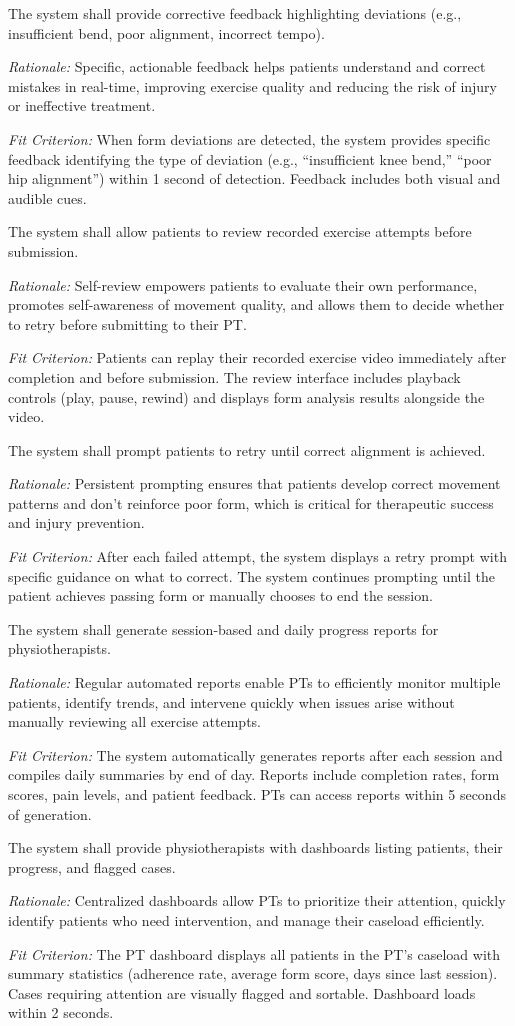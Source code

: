 \documentclass[12pt]{article}
\newcommand{\rationale}[1]{\par\emph{Rationale:} #1}
\newcommand{\fitcrit}[1]{\par\emph{Fit Criterion:} #1}
\begin{document}
\begin{reqlist}
	\item[FR 14.] The system shall provide corrective feedback highlighting deviations (e.g., insufficient bend, poor alignment, incorrect tempo).
	\rationale{Specific, actionable feedback helps patients understand and correct mistakes in real-time, improving exercise quality and reducing the risk of injury or ineffective treatment.}
	\fitcrit{When form deviations are detected, the system provides specific feedback identifying the type of deviation (e.g., ``insufficient knee bend,'' ``poor hip alignment'') within 1 second of detection. Feedback includes both visual and audible cues.}
	
	\item[FR 15.] The system shall allow patients to review recorded exercise attempts before submission.
	\rationale{Self-review empowers patients to evaluate their own performance, promotes self-awareness of movement quality, and allows them to decide whether to retry before submitting to their PT.}
	\fitcrit{Patients can replay their recorded exercise video immediately after completion and before submission. The review interface includes playback controls (play, pause, rewind) and displays form analysis results alongside the video.}
	
	\item[FR 16.] The system shall prompt patients to retry until correct alignment is achieved.
	\rationale{Persistent prompting ensures that patients develop correct movement patterns and don't reinforce poor form, which is critical for therapeutic success and injury prevention.}
	\fitcrit{After each failed attempt, the system displays a retry prompt with specific guidance on what to correct. The system continues prompting until the patient achieves passing form or manually chooses to end the session.}
	
	\item[FR 17.] The system shall generate session-based and daily progress reports for physiotherapists.
	\rationale{Regular automated reports enable PTs to efficiently monitor multiple patients, identify trends, and intervene quickly when issues arise without manually reviewing all exercise attempts.}
	\fitcrit{The system automatically generates reports after each session and compiles daily summaries by end of day. Reports include completion rates, form scores, pain levels, and patient feedback. PTs can access reports within 5 seconds of generation.}
	
	\item[FR 18.] The system shall provide physiotherapists with dashboards listing patients, their progress, and flagged cases.
	\rationale{Centralized dashboards allow PTs to prioritize their attention, quickly identify patients who need intervention, and manage their caseload efficiently.}
	\fitcrit{The PT dashboard displays all patients in the PT's caseload with summary statistics (adherence rate, average form score, days since last session). Cases requiring attention are visually flagged and sortable. Dashboard loads within 2 seconds.}
	

\end{reqlist}
\end{document}
